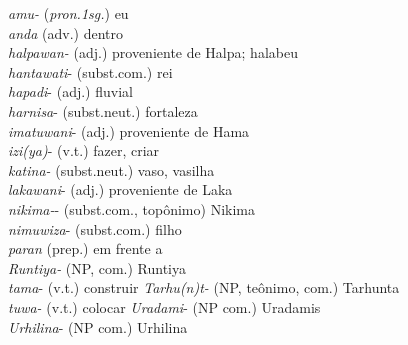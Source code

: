 \noindent \emph{amu-} (\emph{pron.1sg.}) eu\\
\noindent \emph{anda} (adv.) dentro\\
\noindent \emph{halpawan-} (adj.) proveniente de Halpa; halabeu\\
\noindent \emph{hantawati}- (subst.com.) rei\\
\noindent \emph{hapadi}- (adj.) fluvial\\
\noindent \emph{harnisa}- (subst.neut.) fortaleza\\
\noindent \emph{imatuwani}- (adj.) proveniente de Hama\\
\noindent \emph{izi{(ya)}}- (v.t.) fazer, criar\\
\noindent \emph{katina-} (subst.neut.) vaso, vasilha\\
\noindent \emph{lakawani}- (adj.) proveniente de Laka\\
\noindent \emph{nikima-}- (subst.com., topônimo) Nikima\\
\noindent \emph{nimuwiza}- (subst.com.) filho\\
\noindent \emph{paran} (prep.) em frente a\\
\noindent \emph{Runtiya-} (NP, com.) Runtiya\\
\noindent \emph{tama}- (v.t.) construir
\noindent \emph{Tarhu{(n)}t-} (NP, teônimo, com.) Tarhunta\\
\noindent \emph{tuwa-} (v.t.) colocar
\noindent \emph{Uradami}- (NP com.) Uradamis\\
\noindent \emph{Urhilina}- (NP com.) Urhilina\\
